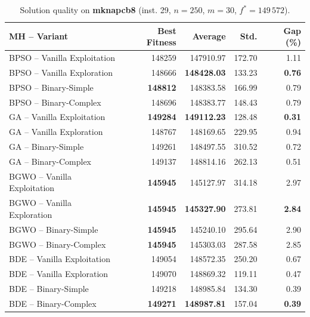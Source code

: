 \documentclass[journal,article,submit,moreauthors]{Definitions/mdpi}
\begin{document}
\begin{table}[htbp]
  \centering
  \small
  \caption{Solution quality on \textbf{mknapcb8} (inst. 29, $n=250$, $m=30$, $f^*=149\,572$).}
  \label{tab:calidad_mknapcb8_29}
  \begin{tabular}{lrrrr}
    \toprule
    \textbf{MH -- Variant} &
    \textbf{Best Fitness} &
    \textbf{Average} &
    \textbf{Std.} &
    \textbf{Gap (\%)} \\
    \midrule
    BPSO -- Vanilla Exploitation &         148259 &        147910.97 & 172.70 &         1.11 \\
    BPSO -- Vanilla Exploration  &         148666 & \textbf{148428.03} & 133.23 & \textbf{0.76} \\
    BPSO -- Binary-Simple        & \textbf{148812} &        148383.58 & 166.99 &         0.79 \\
    BPSO -- Binary-Complex       &         148696 &        148383.77 & 148.43 &         0.79 \\
    \midrule
    GA -- Vanilla Exploitation   & \textbf{149284} & \textbf{149112.23} & 128.48 & \textbf{0.31} \\
    GA -- Vanilla Exploration    &         148767 &        148169.65 & 229.95 &         0.94 \\
    GA -- Binary-Simple          &         149261 &        148497.55 & 310.52 &         0.72 \\
    GA -- Binary-Complex         &         149137 &        148814.16 & 262.13 &         0.51 \\
    \midrule
    BGWO -- Vanilla Exploitation & \textbf{145945} &        145127.97 & 314.18 &         2.97 \\
    BGWO -- Vanilla Exploration  & \textbf{145945} & \textbf{145327.90} & 273.81 & \textbf{2.84} \\
    BGWO -- Binary-Simple        & \textbf{145945} &        145240.10 & 295.64 &         2.90 \\
    BGWO -- Binary-Complex       & \textbf{145945} &        145303.03 & 287.58 &         2.85 \\
    \midrule
    BDE -- Vanilla Exploitation  &         149054 &        148572.35 & 250.20 &         0.67 \\
    BDE -- Vanilla Exploration   &         149070 &        148869.32 & 119.11 &         0.47 \\
    BDE -- Binary-Simple         &         149218 &        148985.84 & 134.30 &         0.39 \\
    BDE -- Binary-Complex        & \textbf{149271} & \textbf{148987.81} & 157.04 & \textbf{0.39} \\
    \bottomrule
  \end{tabular}
\end{table}
\end{document}
